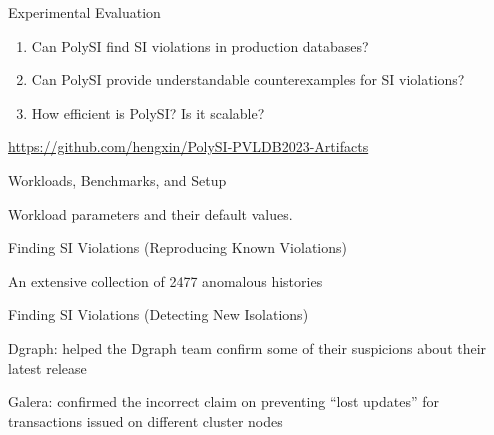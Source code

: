 
\begin{frame}{Experimental Evaluation}
	\begin{center}
		\begin{enumerate}[(1)]
			\setlength{\itemsep}{15pt}
			\item {}
			  Can PolySI find SI violations in production databases?
			\item {}
			  Can PolySI provide understandable counterexamples for SI violations?
			\item {}
			  How efficient is PolySI? Is it scalable?
		\end{enumerate}

		\vspace{0.50cm}
		\url{https://github.com/hengxin/PolySI-PVLDB2023-Artifacts}
	\end{center}
\end{frame}

\begin{frame}{Workloads, Benchmarks, and Setup}
	\begin{center}
		{}

		\vspace{0.50cm}
		{Workload parameters and their default values.}
	\end{center}
\end{frame}

\begin{frame}{Finding SI Violations (Reproducing Known Violations)}
	\begin{center}
		{}
		\vspace{0.60cm}

		An extensive collection of 2477 anomalous histories \\[2pt]
	\end{center}
\end{frame}

\begin{frame}{Finding SI Violations (Detecting New Isolations)}
	\begin{center}
		Dgraph: helped the Dgraph team confirm some of their suspicions
		  about their latest release

		\vspace{0.50cm}
		{}
		\vspace{0.50cm}

		Galera: confirmed the incorrect claim on preventing ``lost updates''
		  for transactions issued on different cluster nodes
	\end{center}
\end{frame}

